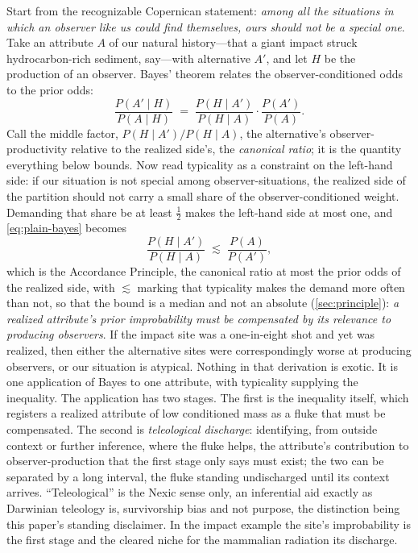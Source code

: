 Start from the recognizable Copernican statement: \emph{among all the situations in which an observer like us could find themselves, ours should not be a special one}. Take an attribute $A$ of our natural history---that a giant impact struck hydrocarbon-rich sediment, say---with alternative $A'$, and let $H$ be the production of an observer. Bayes' theorem relates the observer-conditioned odds to the prior odds:
\begin{equation}
\label{eq:plain-bayes}
\frac{P(A' \mid H)}{P(A \mid H)} \;=\; \frac{P(H \mid A')}{P(H \mid A)} \cdot \frac{P(A')}{P(A)} .
\end{equation}
Call the middle factor, $P(H \mid A')/P(H \mid A)$, the alternative's observer-productivity relative to the realized side's, the \emph{canonical ratio}; it is the quantity everything below bounds. Now read typicality as a constraint on the left-hand side: if our situation is not special among observer-situations, the realized side of the partition should not carry a small share of the observer-conditioned weight. Demanding that share be at least $\tfrac12$ makes the left-hand side at most one, and \eqref{eq:plain-bayes} becomes
\[ \frac{P(H \mid A')}{P(H \mid A)} \;\lesssim\; \frac{P(A)}{P(A')} , \]
which is the Accordance Principle, the canonical ratio at most the prior odds of the realized side, with $\lesssim$ marking that typicality makes the demand more often than not, so that the bound is a median and not an absolute (\autoref{sec:principle}): \emph{a realized attribute's prior improbability must be compensated by its relevance to producing observers}. If the impact site was a one-in-eight shot and yet was realized, then either the alternative sites were correspondingly worse at producing observers, or our situation is atypical. Nothing in that derivation is exotic. It is one application of Bayes to one attribute, with typicality supplying the inequality. The application has two stages. The first is the inequality itself, which registers a realized attribute of low conditioned mass as a fluke that must be compensated. The second is \emph{teleological discharge}: identifying, from outside context or further inference, where the fluke helps, the attribute's contribution to observer-production that the first stage only says must exist; the two can be separated by a long interval, the fluke standing undischarged until its context arrives. ``Teleological'' is the Nexic sense only, an inferential aid exactly as Darwinian teleology is, survivorship bias and not purpose, the distinction being this paper's standing disclaimer. In the impact example the site's improbability is the first stage and the cleared niche for the mammalian radiation its discharge.

